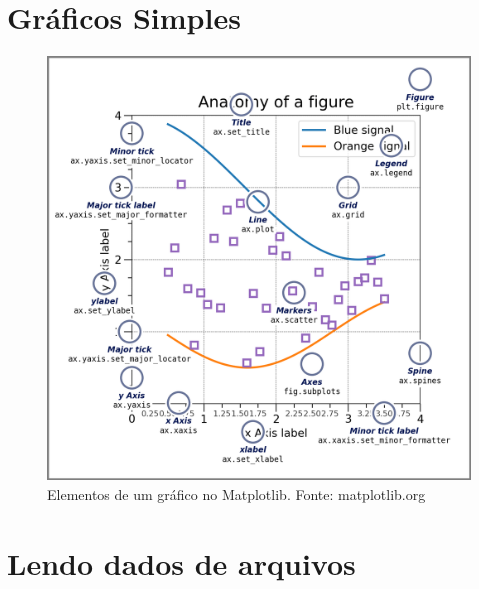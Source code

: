 \section{Gráficos Simples}

\begin{figure}
    \centering
    \includegraphics[scale=0.2]{Images/anatomy.png}
    \caption{Elementos de um gráfico no Matplotlib. Fonte: matplotlib.org}
    \label{fig:anatomy}
\end{figure}

\section{Lendo dados de arquivos}

